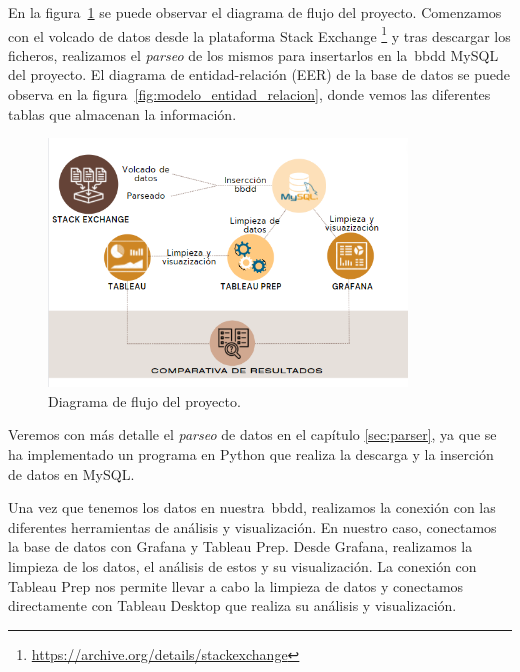 \documentclass[a4paper, 12pt]{book}
\begin{document}
En la figura~\ref{fig:_arquitectura} se puede observar el diagrama de flujo del proyecto. Comenzamos con el volcado de datos desde la plataforma Stack Exchange \footnote{\url{https://archive.org/details/stackexchange}} y tras descargar los ficheros, realizamos el \emph{parseo} de los mismos para insertarlos en la~\gls{bbdd} MySQL del proyecto. El diagrama de entidad-relación (EER) de la base de datos se puede observa en la figura~\ref{fig:modelo_entidad_relacion}, donde vemos las diferentes tablas que almacenan la información.   
\begin{figure}
    \centering
    \includegraphics[width=0.85\textwidth, keepaspectratio]{img/flujo_arquitectura.png}
    \caption{Diagrama de flujo del proyecto.}
    \label{fig:_arquitectura}
\end{figure}


Veremos con más detalle el \emph{parseo} de datos en el capítulo \ref{sec:parser}, ya que se ha implementado un programa en Python que realiza la descarga y la inserción de datos en MySQL.

Una vez que tenemos los datos en nuestra~\gls{bbdd}, realizamos la conexión con las diferentes herramientas de análisis y visualización. En nuestro caso, conectamos la base de datos con Grafana y Tableau Prep. Desde Grafana, realizamos la limpieza de los datos, el análisis de estos y su visualización. La conexión con Tableau Prep nos permite llevar a cabo la limpieza de datos y conectamos directamente con Tableau Desktop que realiza su análisis y visualización.
\end{document}
